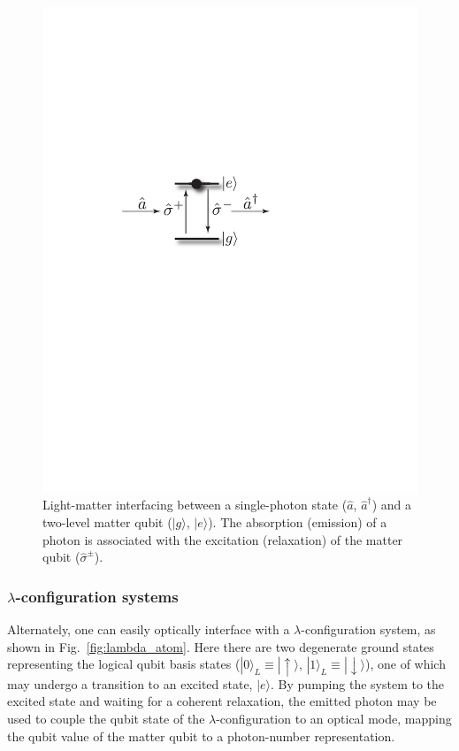 \documentclass[aps, rmp, twocolumn, amsmath, amssymb, nofootinbib, superscriptaddress, longbibliography, floatfix, table-of-contents, eqsecnum]{revtex4-1}
\newcommand{\ket}[1]{|#1\rangle}
\begin{document}
\begin{figure}[!htb]
\includegraphics[width=0.6\columnwidth]{opt_inter}
\caption{Light-matter interfacing between a single-photon state ($\hat{a}$, $\hat{a}^\dag$) and a two-level matter qubit ($\ket{g}$, $\ket{e}$). The absorption (emission) of a photon is associated with the excitation (relaxation) of the matter qubit ($\hat\sigma^\pm$).} \label{fig:opt_int}
\end{figure}

%
%

\subsubsection{$\lambda$-configuration systems} 

Alternately, one can easily optically interface with a $\lambda$-configuration system, as shown in Fig.~\ref{fig:lambda_atom}. Here there are two degenerate ground states representing the logical qubit basis states (\mbox{$\ket{0}_L\equiv\ket{\!\uparrow}$}, \mbox{$\ket{1}_L\equiv\ket{\!\downarrow}$}), one of which may undergo a transition to an excited state, $\ket{e}$. By pumping the system to the excited state and waiting for a coherent relaxation, the emitted photon may be used to couple the qubit state of the $\lambda$-configuration to an optical mode, mapping the qubit value of the matter qubit to a photon-number representation.
\end{document}
